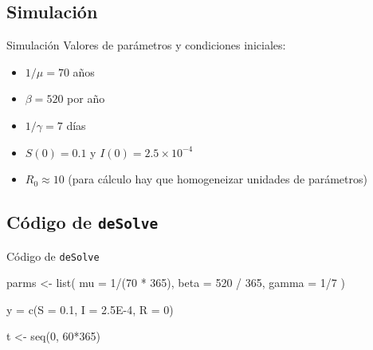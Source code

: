 \documentclass[
  11pt,
  ignorenonframetext,
]{beamer}
\newenvironment{Shaded}{}{}
\newcommand{\AttributeTok}[1]{\textcolor[rgb]{0.49,0.56,0.16}{#1}}
\newcommand{\DecValTok}[1]{\textcolor[rgb]{0.25,0.63,0.44}{#1}}
\newcommand{\FloatTok}[1]{\textcolor[rgb]{0.25,0.63,0.44}{#1}}
\newcommand{\FunctionTok}[1]{\textcolor[rgb]{0.02,0.16,0.49}{#1}}
\newcommand{\NormalTok}[1]{#1}
\newcommand{\OtherTok}[1]{\textcolor[rgb]{0.00,0.44,0.13}{#1}}
\newcommand{\SpecialCharTok}[1]{\textcolor[rgb]{0.25,0.44,0.63}{#1}}
\begin{document}
\hypertarget{simulaciuxf3n}{%
\subsection{Simulación}\label{simulaciuxf3n}}

\begin{frame}{Simulación}
Valores de parámetros y condiciones iniciales:

\begin{itemize}
\item
  \(1/\mu = 70\) años
\item
  \(\beta = 520\) por año
\item
  \(1/\gamma = 7\) días
\item
  \(S(0) = 0.1\) y \(I(0) = 2.5 \times 10^{-4}\)
\item
  \(R_0 \approx 10\) (para cálculo hay que homogeneizar unidades de
  parámetros)
\end{itemize}
\end{frame}

\hypertarget{cuxf3digo-de-desolve}{%
\subsection{\texorpdfstring{Código de
\texttt{deSolve}}{Código de deSolve}}\label{cuxf3digo-de-desolve}}

\begin{frame}[fragile]{Código de \texttt{deSolve}}
\begin{Shaded}
\begin{Highlighting}[]
\NormalTok{parms }\OtherTok{\textless{}{-}} \FunctionTok{list}\NormalTok{(}
  \AttributeTok{mu =} \DecValTok{1}\SpecialCharTok{/}\NormalTok{(}\DecValTok{70} \SpecialCharTok{*} \DecValTok{365}\NormalTok{),}
  \AttributeTok{beta =} \DecValTok{520} \SpecialCharTok{/} \DecValTok{365}\NormalTok{,}
  \AttributeTok{gamma =} \DecValTok{1}\SpecialCharTok{/}\DecValTok{7}
\NormalTok{)}

\NormalTok{y }\OtherTok{=} \FunctionTok{c}\NormalTok{(}\AttributeTok{S =} \FloatTok{0.1}\NormalTok{, }\AttributeTok{I =} \FloatTok{2.5E{-}4}\NormalTok{, }\AttributeTok{R =} \DecValTok{0}\NormalTok{)}

\NormalTok{t }\OtherTok{\textless{}{-}} \FunctionTok{seq}\NormalTok{(}\DecValTok{0}\NormalTok{, }\DecValTok{60}\SpecialCharTok{*}\DecValTok{365}\NormalTok{)}
\end{Highlighting}
\end{Shaded}
\end{frame}
\end{document}
